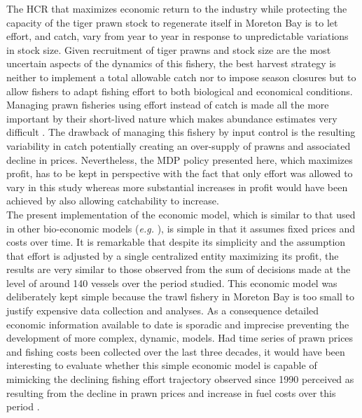 The HCR that maximizes economic return to the industry while protecting the capacity of the tiger prawn stock to regenerate itself in Moreton Bay is to let effort, and catch, vary from year to year in response to unpredictable variations in stock size. Given recruitment of tiger prawns and stock size are the most uncertain aspects of the dynamics of this fishery, the best harvest strategy is neither to implement a total allowable catch \citep{Beddington1977} nor to impose season closures \citep{hil92b} but to allow fishers to adapt fishing effort to both biological and economical conditions. Managing prawn fisheries using effort instead of catch is made all the more important by their short-lived nature which makes abundance estimates very difficult \citep{parsons1993management}. The drawback of managing this fishery by input control is the resulting variability in catch potentially creating an over-supply of prawns and associated decline in prices. Nevertheless, the MDP policy presented here, which maximizes profit, has to be kept in perspective with the fact that only effort was allowed to vary in this study whereas more substantial increases in profit would have been achieved by also allowing catchability to increase. \\

The present implementation of the economic model, which is similar to that used in other bio-economic models ({\it e.g.} \cite{Dichmont05012010}), is simple in that it assumes fixed prices and costs over time. It is remarkable that despite its simplicity and the assumption that effort is adjusted by a single centralized entity maximizing its profit, the results are very similar to those observed from the sum of decisions made at the level of around 140 vessels over the period studied. This economic model was deliberately kept simple because the trawl fishery in Moreton Bay is too small to justify expensive data collection and analyses. As a consequence detailed economic information available to date is sporadic and imprecise preventing the development of more complex, dynamic, models. Had time series of prawn prices and fishing costs been collected over the last three decades, it would have been interesting to evaluate whether this simple economic model is capable of mimicking the declining fishing effort trajectory observed since 1990 perceived as resulting from the decline in prawn prices and increase in fuel costs over this period \citep{Pascoe2017121}. \\

